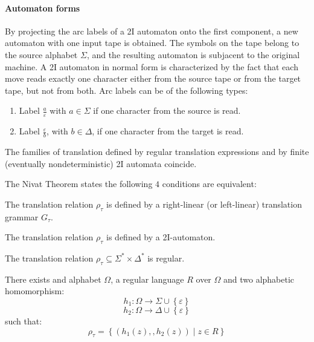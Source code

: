 \paragraph*{Automaton forms}
By projecting the arc labels of a 2I automaton onto the first component, a new automaton with one input tape is obtained.
The symbols on the tape belong to the source alphabet $\Sigma$, and the resulting automaton is subjacent to the original machine.
A 2I automaton in normal form is characterized by the fact that each move reads exactly one character either from the source tape or from the target tape, but not from both.
Arc labels can be of the following types:
\begin{enumerate}
    \item Label $\frac{a}{\varepsilon}$ with $a \in \Sigma$ if one character from the source is read.
    \item Label $\frac{\varepsilon}{b}$, with $b \in \Delta$, if one character from the target is read.
\end{enumerate}
The families of translation defined by regular translation expressions and by finite (eventually nondeterministic) 2I automata coincide.
\begin{theorem}
    The Nivat Theorem states the following $4$ conditions are equivalent:

    The translation relation $\rho_\tau$ is defined by a right-linear (or left-linear) translation grammar $G_\tau$.

    The translation relation $\rho_\tau$ is defined by a 2I-automaton.

    The translation relation $\rho_\tau \subseteq \Sigma^{\ast} \times \Delta^{\ast}$ is regular.

    There exists and alphabet $\Omega$, a regular language $R$ over $\Omega$ and two alphabetic homomorphism: 
    \[h_1 : \Omega \rightarrow \Sigma \cup \left\{ \varepsilon \right\}\]
    \[h_2 : \Omega \rightarrow \Delta \cup \left\{ \varepsilon \right\}\]
    such that:
    \[ \rho_\tau = \left\{ \left( h_1(z), , h_2(z) \right) \mid  z \in R \right\} \]
\end{theorem}

